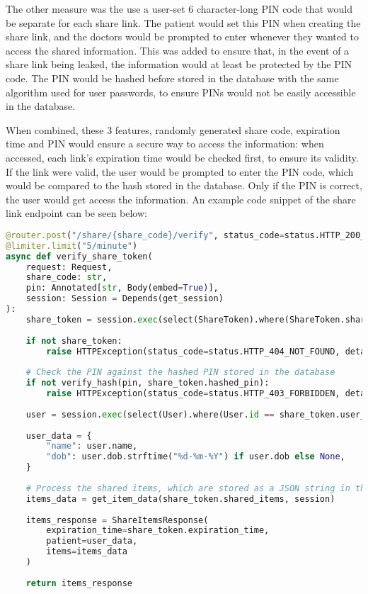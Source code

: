The other measure was the use a user-set 6 character-long PIN code that would be separate for each share link. The patient would set this PIN when creating the share link, and the doctors would be prompted to enter whenever they wanted to access the shared information. This was added to ensure that, in the event of a share link being leaked, the information would at least be protected by the PIN code. The PIN would be hashed before stored in the database with the same algorithm used for user passwords, to ensure PINs would not be easily accessible in the database.

When combined, these 3 features, randomly generated share code, expiration time and PIN would ensure a secure way to access the information: when accessed, each link's expiration time would be checked first, to ensure its validity. If the link were valid, the user would be prompted to enter the PIN code, which would be compared to the hash stored in the database. Only if the PIN is correct, the user would get access the information. An example code snippet of the share link endpoint can be seen below:

\begin{lstlisting}[language=Python, caption=Share Link Endpoint]
@router.post("/share/{share_code}/verify", status_code=status.HTTP_200_OK, response_model=ShareItemsResponse)
@limiter.limit("5/minute")
async def verify_share_token(
    request: Request,
    share_code: str,
    pin: Annotated[str, Body(embed=True)],
    session: Session = Depends(get_session)
):
    share_token = session.exec(select(ShareToken).where(ShareToken.share_code == share_code)).first()
    
    if not share_token:
        raise HTTPException(status_code=status.HTTP_404_NOT_FOUND, detail="Share token not found")
    
    # Check the PIN against the hashed PIN stored in the database
    if not verify_hash(pin, share_token.hashed_pin):
        raise HTTPException(status_code=status.HTTP_403_FORBIDDEN, detail="Invalid PIN")
    
    user = session.exec(select(User).where(User.id == share_token.user_id)).first()
    
    user_data = {
        "name": user.name,
        "dob": user.dob.strftime("%d-%m-%Y") if user.dob else None,
    }
    
    # Process the shared items, which are stored as a JSON string in the database
    items_data = get_item_data(share_token.shared_items, session)
    
    items_response = ShareItemsResponse(
        expiration_time=share_token.expiration_time,
        patient=user_data,
        items=items_data
    )
    
    return items_response
\end{lstlisting}

